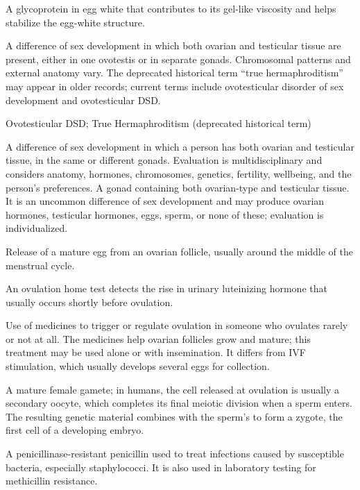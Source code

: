  A glycoprotein in egg white that contributes to its gel-like viscosity and helps stabilize the egg-white structure.

 A difference of sex development in which both ovarian and testicular tissue are present, either in one ovotestis or in separate gonads. Chromosomal patterns and external anatomy vary. The deprecated historical term ``true hermaphroditism'' may appear in older records; current terms include ovotesticular disorder of sex development and ovotesticular DSD.

\synonyms
Ovotesticular DSD; True Hermaphroditism (deprecated historical term)

 A difference of sex development in which a person has both ovarian and testicular tissue, in the same or different gonads. Evaluation is multidisciplinary and considers anatomy, hormones, chromosomes, genetics, fertility, wellbeing, and the person’s preferences.
 A gonad containing both ovarian-type and testicular tissue. It is an uncommon difference of sex development and may produce ovarian hormones, testicular hormones, eggs, sperm, or none of these; evaluation is individualized.

 Release of a mature egg from an ovarian follicle, usually around the middle of the menstrual cycle.

 An ovulation home test detects the rise in urinary luteinizing hormone that usually occurs shortly before ovulation.

 Use of medicines to trigger or regulate ovulation in someone who ovulates rarely or not at all. The medicines help ovarian follicles grow and mature; this treatment may be used alone or with insemination. It differs from IVF stimulation, which usually develops several eggs for collection.

 A mature female gamete; in humans, the cell released at ovulation is usually a secondary oocyte, which completes its final meiotic division when a sperm enters. The resulting genetic material combines with the sperm’s to form a zygote, the first cell of a developing embryo.

 A penicillinase-resistant penicillin used to treat infections caused by susceptible bacteria, especially staphylococci. It is also used in laboratory testing for methicillin resistance.


